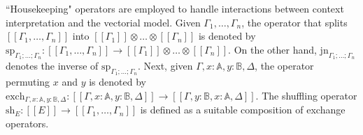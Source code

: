 ``Housekeeping" operators are employed to handle interactions between context interpretation and the vectorial model. Given $\Gamma_{1}, \ldots, \Gamma_{n}$, the operator that splits $[\![\Gamma_{1}, \ldots, \Gamma_{n}]\!]$ into $[\![\Gamma_{1}]\!] \otimes \ldots \otimes [\![\Gamma_{n}]\!]  $ is denoted by $\text{sp}_{\Gamma_1;\ldots;\Gamma_n}: [\![\Gamma_{1}, \ldots, \Gamma_{n}]\!] \xrightarrow{} [\![\Gamma_{1}]\!] \otimes \ldots \otimes [\![\Gamma_{n}]\!] $.
On the other hand, $\text{jn}_{\Gamma_1;\ldots;\Gamma_n}$ denotes the inverse of $\text{sp}_{\Gamma_1;\ldots;\Gamma_n}$. Next, given $\Gamma, x : \mathbb{A}, y : \mathbb{B},\Delta$, the operator permuting $x$ and $y$ is denoted by $\text{exch}_{\Gamma, x : \mathbb{A}, y : \mathbb{B},\Delta}: [\![\Gamma, x : \mathbb{A}, y : \mathbb{B},\Delta]\!] \xrightarrow{} [\![\Gamma, y : \mathbb{B}, x : \mathbb{A}, \Delta]\!] $. The shuffling operator $\text{sh}_{E}: [\![E]\!] \xrightarrow{} [\![\Gamma_1, \ldots, \Gamma_n ]\!]$ is defined as a suitable composition
of exchange operators.

